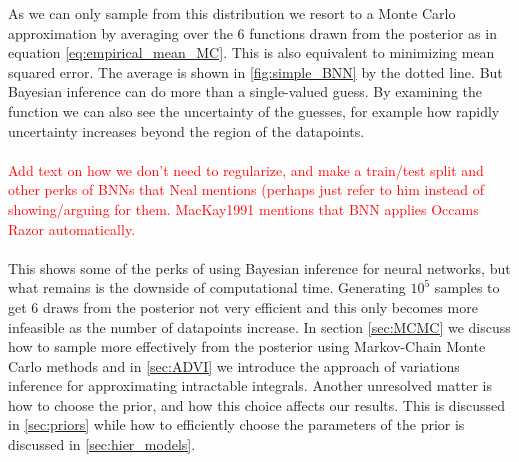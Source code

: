 As we can only sample from this distribution we resort to a Monte Carlo approximation by averaging over the 6 functions drawn from the posterior as in equation \ref{eq:empirical_mean_MC}. This is also equivalent to minimizing mean squared error. The average is shown in \ref{fig:simple_BNN} by the dotted line. But Bayesian inference can do more than a single-valued guess. By examining the function we can also see the uncertainty of the guesses, for example how rapidly uncertainty increases beyond the region of the datapoints. 
\\
\\
\textcolor{red}{Add text on how we don't need to regularize, and make a train/test split and other perks of BNNs that Neal mentions (perhaps just refer to him instead of showing/arguing for them. MacKay1991 mentions that BNN applies Occams Razor automatically.}\\
\\
This shows some of the perks of using Bayesian inference for neural networks, but what remains is the downside of computational time. Generating $10^5$ samples to get 6 draws from the posterior not very efficient and this only becomes more infeasible as the number of datapoints increase. In section \ref{sec:MCMC} we discuss how to sample more effectively from the posterior using Markov-Chain Monte Carlo methods and in \ref{sec:ADVI} we introduce the approach of variations inference for approximating intractable integrals. Another unresolved matter is how to choose the prior, and how this choice affects our results. This is discussed in \ref{sec:priors} while how to efficiently choose the parameters of the prior is discussed in \ref{sec:hier_models}.


